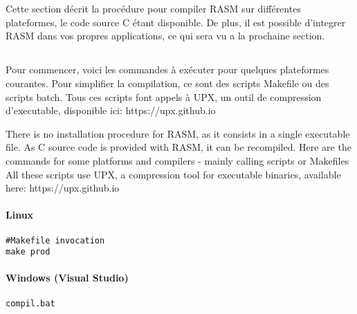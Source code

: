 \section{}

\begin{xfr}
Cette section décrit la procédure pour compiler RASM sur différentes plateformes, le code source C étant disponible. De plus, il est possible d'integrer RASM dans vos propres applications, ce qui sera vu a la prochaine section.
\end{xfr}

\subsection{}

\begin{xfr}
Pour commencer, voici les commandes à exécuter pour quelques plateformes courantes.
Pour simplifier la compilation, ce sont des scripts Makefile ou des scripts batch. 
Tous ces scripts font appels à UPX, un outil de compression d'executable, disponible ici: https://upx.github.io
\end{xfr}

\begin{xen}
There is no installation procedure for RASM, as it consists in a single executable file. As C source code is provided with RASM, it can be recompiled. 
Here are the commands for some platforms and compilers - mainly calling scripts or Makefiles 
All these scripts use UPX, a compression tool for executable binaries, available here: https://upx.github.io
\end{xen}

\paragraph{Linux}

\begin{verbatim}
#Makefile invocation
make prod
\end{verbatim}

\paragraph{Windows (Visual Studio)}

\begin{verbatim}
compil.bat
\end{verbatim}

